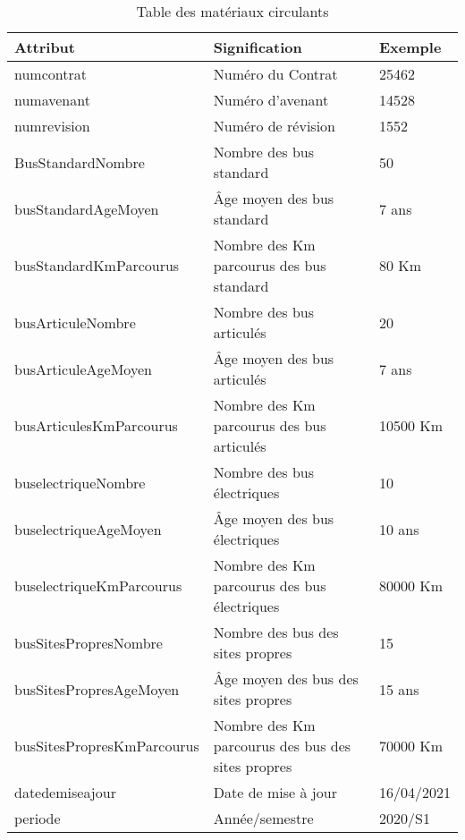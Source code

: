 	\begin{table}[H]
		\begin{center}
			\begin{tabularx}{17.5cm}{|p{6cm}|X|p{2.5cm}|}
				\hline
				\textbf{Attribut}          & \textbf{Signification}                            & \textbf{Exemple} \\
				\hline
				numcontrat                 & Numéro du Contrat                                 & 25462            \\
				\hline
				numavenant                 & Numéro d'avenant                                  & 14528            \\
				\hline
				numrevision                & Numéro de révision                                & 1552             \\
				\hline
				BusStandardNombre          & Nombre des bus standard                           & 50               \\
				\hline
				busStandardAgeMoyen        & Âge moyen des bus standard                        & 7 ans            \\
				\hline
				busStandardKmParcourus     & Nombre des Km parcourus des bus standard          & 80 Km            \\
				\hline
				busArticuleNombre          & Nombre des bus articulés                          & 20               \\
				\hline
				busArticuleAgeMoyen        & Âge moyen des bus articulés                       & 7 ans            \\
				\hline
				busArticulesKmParcourus    & Nombre des Km parcourus des bus articulés         & 10500 Km         \\
				\hline
				buselectriqueNombre        & Nombre des bus électriques                        & 10               \\
				\hline
				buselectriqueAgeMoyen      & Âge moyen des bus électriques                     & 10 ans           \\
				\hline
				buselectriqueKmParcourus   & Nombre des Km parcourus des bus électriques       & 80000 Km         \\
				\hline
				busSitesPropresNombre      & Nombre des bus des sites propres                  & 15               \\
				\hline
				busSitesPropresAgeMoyen    & Âge moyen des bus des sites propres               & 15 ans           \\
				\hline
				busSitesPropresKmParcourus & Nombre des Km parcourus des bus des sites propres & 70000 Km         \\
				\hline
				datedemiseajour            & Date de mise à jour                               & 16/04/2021       \\
				\hline
				periode                    & Année/semestre                                    & 2020/S1          \\
				\hline
			\end{tabularx}
			\caption{Table des matériaux circulants}
		\end{center}
	\end{table}

